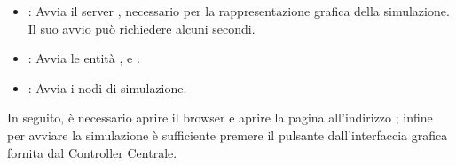 		\begin{itemize}
			\item {} : Avvia il server , necessario per la rappresentazione grafica della simulazione. Il suo avvio può richiedere alcuni secondi.
			\item {} : Avvia le entità ,  e .
			\item {} : Avvia i nodi di simulazione.
		\end{itemize}
		
	In seguito, è necessario aprire il browser  e aprire la pagina all'indirizzo ; infine per avviare la simulazione è sufficiente premere il pulsante  dall'interfaccia grafica fornita dal Controller Centrale.
	 
